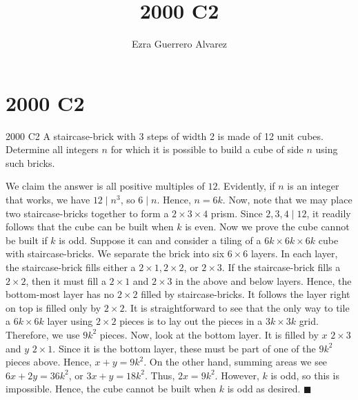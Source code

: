 \documentclass[14pt]{article}
\title{2000 C2}
\author{Ezra Guerrero Alvarez}
\begin{document}
\maketitle
	
\section*{2000 C2}

\begin{statement}{2000 C2}
	A staircase-brick with 3 steps of width 2 is made of 12 unit cubes. Determine all integers $n$ for which it is possible to build a cube of side $n$ using such bricks.
\end{statement}
We claim the answer is all positive multiples of $12$. Evidently, if $n$ is an integer that works, we have $12\mid n^3$, so $6\mid n$. Hence, $n=6k$. Now, note that we may place two staircase-bricks together to form a $2\times3\times4$ prism. Since $2,3,4\mid12$, it readily follows that the cube can be built when $k$ is even. Now we prove the cube cannot be built if $k$ is odd. Suppose it can and consider a tiling of a $6k\times6k\times6k$ cube with staircase-bricks. We separate the brick into six $6\times6$ layers. In each layer, the staircase-brick fills either a $2\times1,2\times2$, or $2\times3$. If the staircase-brick fills a $2\times2$, then it must fill a $2\times1$ and $2\times3$ in the above and below layers. Hence, the bottom-most layer has no $2\times2$ filled by staircase-bricks. It follows the layer right on top is filled only by $2\times2$. It is straightforward to see that the only way to tile a $6k\times6k$ layer using $2\times2$ pieces is to lay out the pieces in a $3k\times3k$ grid. Therefore, we use $9k^2$ pieces. Now, look at the bottom layer. It is filled by $x$ $2\times3$ and $y$ $2\times1$. Since it is the bottom layer, these must be part of one of the $9k^2$ pieces above. Hence, $x+y=9k^2$. On the other hand, summing areas we see $6x+2y=36k^2$, or $3x+y=18k^2$. Thus, $2x=9k^2$. However, $k$ is odd, so this is impossible. Hence, the cube cannot be built when $k$ is odd as desired. $\blacksquare$
	
\end{document}
